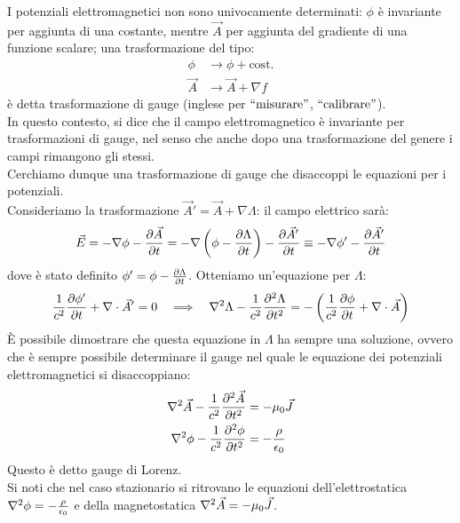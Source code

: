 I potenziali elettromagnetici non sono univocamente determinati: $ \phi $ è invariante per aggiunta di una costante, mentre $ \vec{A} $ per aggiunta del gradiente di una funzione scalare; una trasformazione del tipo:
\begin{equation}
	\begin{split}
		\phi &\longrightarrow \phi + \text{cost.} \\ 
		\vec{A} &\longrightarrow \vec{A} + \nabla f
	\end{split}
	\label{eq:76}
\end{equation}
è detta trasformazione di gauge (inglese per $ ``\text{misurare}" $, $ ``\text{calibrare}" $). \\ 
In questo contesto, si dice che il campo elettromagnetico è invariante per trasformazioni di gauge, nel senso che anche dopo una trasformazione del genere i campi rimangono gli stessi. \\ 
%
Cerchiamo dunque una trasformazione di gauge che disaccoppi le equazioni per i potenziali. \\ 
%
Consideriamo la trasformazione $ \vec{A}' = \vec{A} + \nabla\Lambda $: il campo elettrico sarà:
\begin{equation}
	\vec{E} = -\nabla\phi - \frac{\partial\vec{A}}{\partial t} = -\nabla\left(\phi - \frac{\partial \Lambda}{\partial t}\right) - \frac{\partial\vec{A}'}{\partial t} \equiv -\nabla\phi' - \frac{\partial\vec{A}'}{\partial t}
	\label{eq:77}
\end{equation}
dove è stato definito $ \phi' = \phi - \frac{\partial \Lambda}{\partial t} $. Otteniamo un'equazione per $ \Lambda $:
\begin{equation}
	\frac{1}{c^2} \frac{\partial\phi'}{\partial t} + \nabla\cdot\vec{A}' = 0 \quad\Longrightarrow\quad \nabla^2 \Lambda - \frac{1}{c^2} \frac{\partial^2 \Lambda}{\partial t^2} = - \left( \frac{1}{c^2} \frac{\partial \phi}{\partial t} + \nabla\cdot\vec{A}\right)
	\label{eq:78}
\end{equation}
È possibile dimostrare che questa equazione in $ \Lambda $ ha sempre una soluzione, ovvero che è sempre possibile determinare il gauge nel quale le equazione dei potenziali elettromagnetici si disaccoppiano:
\begin{align}
	\nabla^2\vec{A} - \frac{1}{c^2} \frac{\partial^2 \vec{A}}{\partial t^2} &= - \mu_0 \vec{J} \\ 
	\nabla^2\phi - \frac{1}{c^2} \frac{\partial^2 \phi}{\partial t^2} &= - \frac{\rho}{\epsilon_0}
	\label{eq:79-80}
\end{align}
Questo è detto gauge di Lorenz.	\\ 
Si noti che nel caso stazionario si ritrovano le equazioni dell'elettrostatica $ \nabla^2\phi = - \frac{\rho}{\epsilon_0} $ e della magnetostatica $ \nabla^2\vec{A} = -\mu_0 \vec{J} $. \\ 
